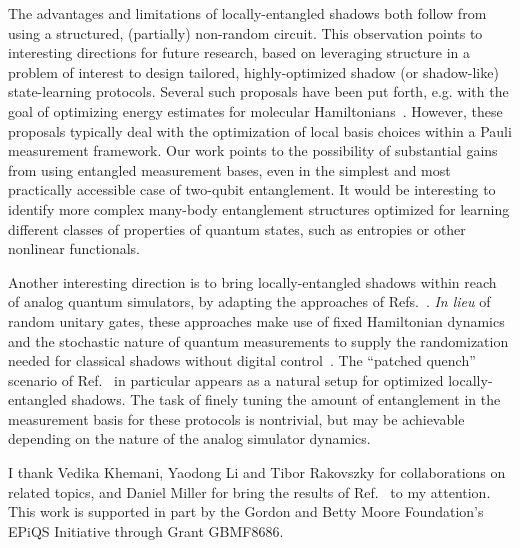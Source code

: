 \documentclass[a4paper,twocolumns,11pt,accepted=2024-03-04]{quantumarticle}
\begin{document}
The advantages and limitations of locally-entangled shadows both follow from using a structured, (partially) non-random circuit. 
This observation points to interesting directions for future research, based on leveraging structure in a problem of interest to design tailored, highly-optimized shadow (or shadow-like) state-learning protocols. 
Several such proposals have been put forth, e.g. with the goal of optimizing energy estimates for molecular Hamiltonians~\cite{hadfield_measurements_2020,huang_efficient_2021,hadfield_adaptive_2021,hillmich_decision_2021,yen_deterministic_2023,wu_overlapped_2023}. However, these proposals typically deal with the optimization of local basis choices within a Pauli measurement framework. Our work points to the possibility of substantial gains from using entangled measurement bases, even in the simplest and most practically accessible case of two-qubit entanglement.
It would be interesting to identify more complex many-body entanglement structures optimized for learning different classes of properties of quantum states, such as entropies or other nonlinear functionals.

Another interesting direction is to bring locally-entangled shadows within reach of analog quantum simulators, by adapting the approaches of Refs.~\cite{tran_measuring_2023, mcginley_shadow_2022}. 
{\it In lieu} of random unitary gates, these approaches make use of fixed Hamiltonian dynamics and the stochastic nature of quantum measurements to supply the randomization needed for classical shadows without digital control~\cite{choi_preparing_2023,cotler_emergent_2023,ho_exact_2022,claeys_emergent_2022,ippoliti_dynamical_2023,ippoliti_solvable_2022, claeys_universality_2023}.
The ``patched quench'' scenario of Ref.~\cite{tran_measuring_2023} in particular appears as a natural setup for optimized locally-entangled shadows. The task of finely tuning the amount of entanglement in the measurement basis for these protocols is nontrivial, but may be achievable depending on the nature of the analog simulator dynamics. 


\acknowledgments
I thank Vedika Khemani, Yaodong Li and Tibor Rakovszky for collaborations on related topics, and Daniel Miller for bring the results of Ref.~\cite{miller_shor-laflamme_2023} to my attention.
This work is supported  in  part  by  the Gordon and Betty Moore Foundation's EPiQS Initiative through Grant GBMF8686. 



\end{document}
